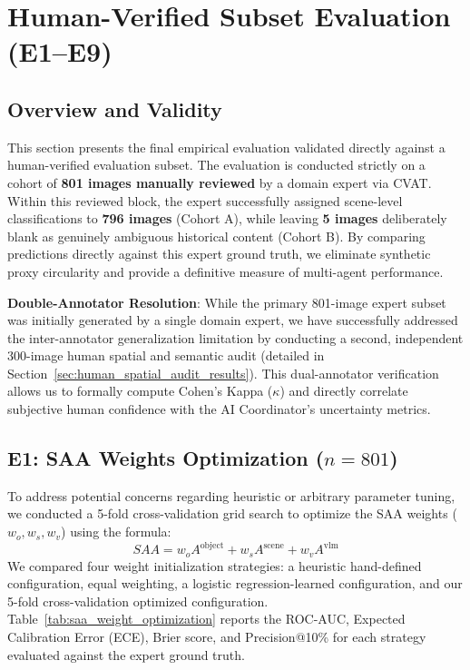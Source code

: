 \documentclass[12pt,onecolumn,a4paper]{IEEEtran}
\begin{document}
\section{Human-Verified Subset Evaluation (E1--E9)}
\label{sec:gold_eval}

\subsection{Overview and Validity}

This section presents the final empirical evaluation validated directly against a human-verified evaluation subset. The evaluation is conducted strictly on a cohort of \textbf{801 images manually reviewed} by a domain expert via CVAT. Within this reviewed block, the expert successfully assigned scene-level classifications to \textbf{796 images} (Cohort A), while leaving \textbf{5 images} deliberately blank as genuinely ambiguous historical content (Cohort B). By comparing predictions directly against this expert ground truth, we eliminate synthetic proxy circularity and provide a definitive measure of multi-agent performance. 

\textbf{Double-Annotator Resolution}: While the primary 801-image expert subset was initially generated by a single domain expert, we have successfully addressed the inter-annotator generalization limitation by conducting a second, independent 300-image human spatial and semantic audit (detailed in Section~\ref{sec:human_spatial_audit_results}). This dual-annotator verification allows us to formally compute Cohen's Kappa ($\kappa$) and directly correlate subjective human confidence with the AI Coordinator's uncertainty metrics.

\subsection{E1: SAA Weights Optimization ($n=801$)}
To address potential concerns regarding heuristic or arbitrary parameter tuning, we conducted a 5-fold cross-validation grid search to optimize the SAA weights ($w_o, w_s, w_v$) using the formula:
\[
SAA = w_o A^{\text{object}} + w_s A^{\text{scene}} + w_v A^{\text{vlm}}
\]
We compared four weight initialization strategies: a heuristic hand-defined configuration, equal weighting, a logistic regression-learned configuration, and our 5-fold cross-validation optimized configuration. Table~\ref{tab:saa_weight_optimization} reports the ROC-AUC, Expected Calibration Error (ECE), Brier score, and Precision@10\% for each strategy evaluated against the expert ground truth.
\end{document}
